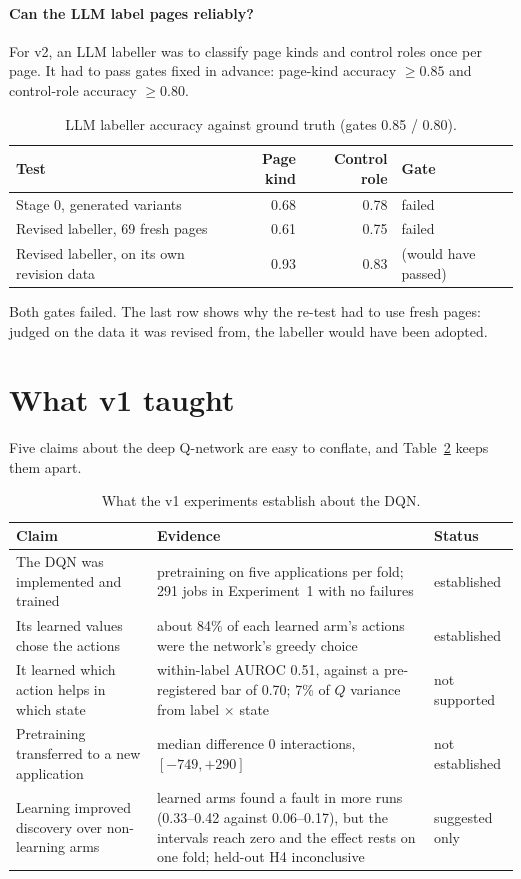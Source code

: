 \paragraph{Can the LLM label pages reliably?} For v2, an LLM labeller was to classify page
kinds and control roles once per page. It had to pass gates fixed in advance: page-kind
accuracy $\ge 0.85$ and control-role accuracy $\ge 0.80$.

\begin{table}[H]
\centering
\small
\caption{LLM labeller accuracy against ground truth (gates 0.85 / 0.80).}
\label{tab:labeller}
\begin{tabular}{@{}lrrl@{}}
\toprule
Test & Page kind & Control role & Gate \\
\midrule
Stage 0, generated variants & 0.68 & 0.78 & failed \\
Revised labeller, 69 fresh pages & 0.61 & 0.75 & failed \\
Revised labeller, on its own revision data & 0.93 & 0.83 & (would have passed) \\
\bottomrule
\end{tabular}
\end{table}

Both gates failed. The last row shows why the re-test had to use fresh pages: judged on the
data it was revised from, the labeller would have been adopted.

\section{What v1 taught}
\label{sec:v1-lessons}

Five claims about the deep Q-network are easy to conflate, and Table~\ref{tab:v1-claims}
keeps them apart.

\begin{table}[H]
\centering
\small
\caption{What the v1 experiments establish about the DQN.}
\label{tab:v1-claims}
\begin{tabularx}{\textwidth}{@{}X X l@{}}
\toprule
Claim & Evidence & Status \\
\midrule
The DQN was implemented and trained & pretraining on five applications per fold; 291 jobs in Experiment~1 with no failures & established \\
Its learned values chose the actions & about 84\% of each learned arm's actions were the network's greedy choice & established \\
It learned which action helps in which state & within-label AUROC 0.51, against a pre-registered bar of 0.70; 7\% of $Q$ variance from label $\times$ state & not supported \\
Pretraining transferred to a new application & median difference 0 interactions, $[-749, +290]$ & not established \\
Learning improved discovery over non-learning arms & learned arms found a fault in more runs (0.33--0.42 against 0.06--0.17), but the intervals reach zero and the effect rests on one fold; held-out H4 inconclusive & suggested only \\
\bottomrule
\end{tabularx}
\end{table}


